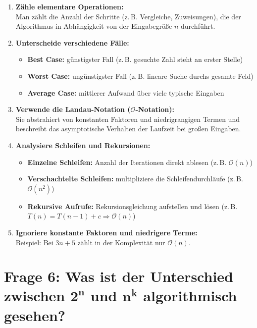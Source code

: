 \documentclass{article}
\begin{document}
\begin{enumerate}
	\item \textbf{Zähle elementare Operationen:} \\
	Man zählt die Anzahl der Schritte (z.\,B. Vergleiche, Zuweisungen), die der Algorithmus in Abhängigkeit von der Eingabegröße \( n \) durchführt.
	
	\item \textbf{Unterscheide verschiedene Fälle:}
	\begin{itemize}
		\item \textbf{Best Case:} günstigster Fall (z.\,B. gesuchte Zahl steht an erster Stelle)
		\item \textbf{Worst Case:} ungünstigster Fall (z.\,B. lineare Suche durchs gesamte Feld)
		\item \textbf{Average Case:} mittlerer Aufwand über viele typische Eingaben
	\end{itemize}
	
	\item \textbf{Verwende die Landau-Notation (\( \mathcal{O} \)-Notation):} \\
	Sie abstrahiert von konstanten Faktoren und niedrigrangigen Termen und beschreibt das asymptotische Verhalten der Laufzeit bei großen Eingaben.
	
	\item \textbf{Analysiere Schleifen und Rekursionen:}
	\begin{itemize}
		\item \textbf{Einzelne Schleifen:} Anzahl der Iterationen direkt ablesen (z.\,B. \( \mathcal{O}(n) \))
		\item \textbf{Verschachtelte Schleifen:} multipliziere die Schleifendurchläufe (z.\,B. \( \mathcal{O}(n^2) \))
		\item \textbf{Rekursive Aufrufe:} Rekursionsgleichung aufstellen und lösen (z.\,B. \( T(n) = T(n-1) + c \Rightarrow \mathcal{O}(n) \))
	\end{itemize}
	
	\item \textbf{Ignoriere konstante Faktoren und niedrigere Terme:} \\
	Beispiel: Bei \( 3n + 5 \) zählt in der Komplexität nur \( \mathcal{O}(n) \).
\end{enumerate}
\section*{Frage 6: Was ist der Unterschied zwischen \( \boldsymbol{2^n} \) und \( \boldsymbol{n^k} \) algorithmisch gesehen?}
\end{document}
